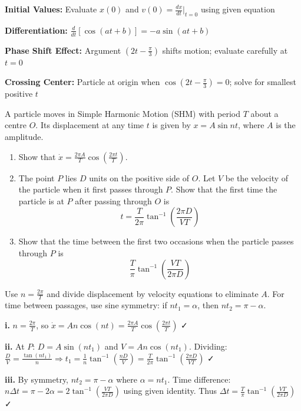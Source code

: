 \begin{takeaways}
\item \textbf{Initial Values:} Evaluate $x(0)$ and $v(0) = \frac{dx}{dt}|_{t=0}$ using given equation
\item \textbf{Differentiation:} $\frac{d}{dt}[\cos(at + b)] = -a\sin(at + b)$
\item \textbf{Phase Shift Effect:} Argument $(2t - \frac{\pi}{3})$ shifts motion; evaluate carefully at $t=0$
\item \textbf{Crossing Center:} Particle at origin when $\cos(2t - \frac{\pi}{3}) = 0$; solve for smallest positive $t$
\end{takeaways}

\begin{problem}
A particle moves in Simple Harmonic Motion (SHM) with period $T$ about a centre $O$. Its displacement at any time $t$ is given by $x = A \sin nt$, where $A$ is the amplitude.
\begin{enumerate}[label=\textbf{\roman*.}]
    \item Show that $\dot{x} = \frac{2\pi A}{T} \cos \left(\frac{2\pi t}{T}\right)$.
    \item The point $P$ lies $D$ units on the positive side of $O$. Let $V$ be the velocity of the particle when it first passes through $P$. Show that the first time the particle is at $P$ after passing through $O$ is 
    \[ t = \frac{T}{2\pi} \tan^{-1} \left( \frac{2\pi D}{VT} \right) \]
    \item Show that the time between the first two occasions when the particle passes through $P$ is 
    \[ \frac{T}{\pi} \tan^{-1} \left( \frac{VT}{2\pi D} \right) \]
\end{enumerate}
\end{problem}

\begin{hint}
Use $n = \frac{2\pi}{T}$ and divide displacement by velocity equations to eliminate $A$. For time between passages, use sine symmetry: if $nt_1 = \alpha$, then $nt_2 = \pi - \alpha$.
\end{hint}

\begin{solution}
\textbf{i.} $n = \frac{2\pi}{T}$, so $\dot{x} = An\cos(nt) = \frac{2\pi A}{T}\cos\left(\frac{2\pi t}{T}\right)$ ✓

\textbf{ii.} At $P$: $D = A\sin(nt_1)$ and $V = An\cos(nt_1)$. Dividing: $\frac{D}{V} = \frac{\tan(nt_1)}{n} \Rightarrow t_1 = \frac{1}{n}\tan^{-1}\left(\frac{nD}{V}\right) = \frac{T}{2\pi}\tan^{-1}\left(\frac{2\pi D}{VT}\right)$ ✓

\textbf{iii.} By symmetry, $nt_2 = \pi - \alpha$ where $\alpha = nt_1$. Time difference: $n\Delta t = \pi - 2\alpha = 2\tan^{-1}\left(\frac{VT}{2\pi D}\right)$ using given identity. Thus $\Delta t = \frac{T}{\pi}\tan^{-1}\left(\frac{VT}{2\pi D}\right)$ ✓
\end{solution}

